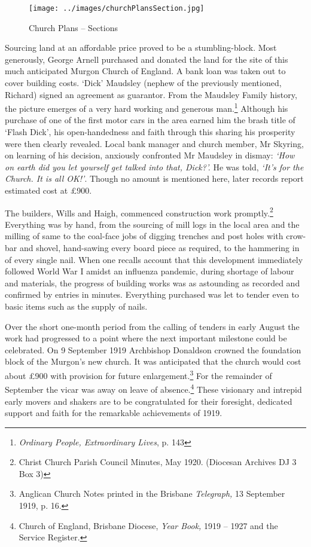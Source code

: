 \begin{figure}
\begin{center}
\texttt{[image: ../images/churchPlansSection.jpg]}
\caption{Church Plans -- Sections}
\end{center}
\end{figure}




Sourcing land at an affordable price proved to be a stumbling-block. Most generously, George Arnell purchased and donated the land for the site of this much anticipated Murgon Church of England. A bank loan was taken out to cover building costs. `Dick' Maudsley (nephew of the previously mentioned, Richard) signed an agreement as guarantor. From the Maudsley Family history, the picture emerges of a very hard working and generous man.\footnote{\emph{Ordinary People, Extraordinary Lives}, p. 143} Although his purchase of one of the first motor cars in the area earned him the brash title of `Flash Dick', his open-handedness and faith through this sharing his prosperity were then clearly revealed. Local bank manager and church member, Mr Skyring, on learning of his decision, anxiously confronted Mr Maudsley in dismay: \emph{`How on earth did you let yourself get talked into that, Dick?'.} He was told, \emph{`It's for the Church. It is all OK!'}. Though no amount is mentioned here, later records report estimated cost at \pounds900.


The builders, Wills and Haigh, commenced construction work promptly.\footnote{Christ Church Parish Council Minutes, May 1920. (Diocesan Archives DJ 3 Box 3)} Everything was by hand, from the sourcing of mill logs in the local area and the milling of same to the coal-face jobs of digging trenches and post holes with crow-bar and shovel, hand-sawing every board piece as required, to the hammering in of every single nail. When one recalls account that this development immediately followed World War I amidst an influenza pandemic, during shortage of labour and materials, the progress of building works was as astounding as recorded and confirmed by entries in minutes. Everything purchased was let to tender even to basic items such as the supply of nails.


Over the short one-month period from the calling of tenders in early August the work had progressed to a point where the next important milestone could be celebrated. On 9 September 1919 Archbishop Donaldson crowned the foundation block of the Murgon's new church. It was anticipated that the church would cost about \pounds900 with provision for future enlargement.\footnote{Anglican Church Notes printed in the Brisbane \emph{Telegraph,} 13 September 1919, p. 16.} For the remainder of September the vicar was away on leave of absence.\footnote{Church of England, Brisbane Diocese, \emph{Year Book,} 1919 -- 1927 and the Service Register.} These visionary and intrepid early movers and shakers are to be congratulated for their foresight, dedicated support and faith for the remarkable achievements of 1919.


